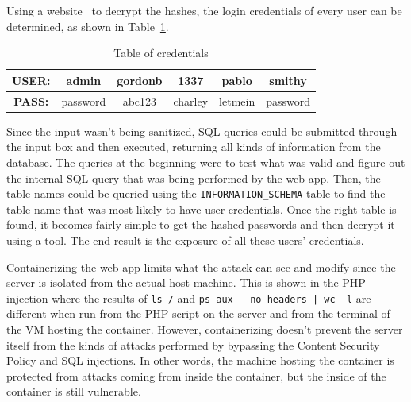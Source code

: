 \documentclass[11pt]{article}
\begin{document}
Using a website~\cite{md5} to decrypt the hashes, the login credentials of every user can be determined, as shown in Table~\ref{table:creds}.
\begin{table}[h]
  \centering
  \begin{tabular}{ |c|c|c|c|c|c| }
    \hline
    \textbf{USER:} & admin    & gordonb & 1337    & pablo   & smithy   \\ \hline
    \textbf{PASS:} & password & abc123  & charley & letmein & password \\ \hline
  \end{tabular}
  \caption{\label{table:creds}
  Table of credentials}
\end{table}
Since the input wasn't being sanitized, SQL queries could be submitted through the input box and then executed, returning all kinds
of information from the database. The queries at the beginning were to test what was valid and figure out the internal SQL query
that was being performed by the web app. Then, the table names could be queried using the \verb|INFORMATION_SCHEMA| table to find
the table name that was most likely to have user credentials. Once the right table is found, it becomes fairly simple to get the
hashed passwords and then decrypt it using a tool. The end result is the exposure of all these users' credentials.

Containerizing the web app limits what the attack can see and modify since the server is isolated from the actual host machine. This
is shown in the PHP injection where the results of \verb|ls /| and \verb=ps aux --no-headers | wc -l= are different when run from
the PHP script on the server and from the terminal of the VM hosting the container. However, containerizing doesn't prevent the
server itself from the kinds of attacks performed by bypassing the Content Security Policy and SQL injections. In other words,
the machine hosting the container is protected from attacks coming from inside the container, but the inside of the container is
still vulnerable.
\end{document}
